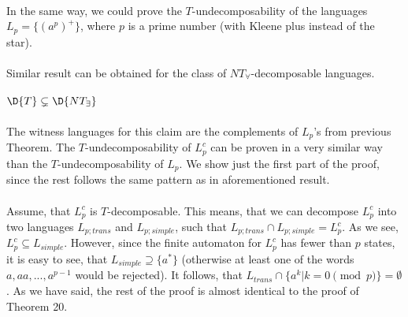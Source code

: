 \paragraph{}
\poznamka In the same way, we could prove the $T$-undecomposability of the languages $L_{p} = \{ (a^p)^+\}$,  where $p$ is a prime number (with Kleene plus instead of the star).

\paragraph{}
Similar result can be obtained for the class of $NT_{\forall}$-decomposable languages.

\paragraph{}
\cveta $\D{T} \subsetneq \D{NT_{\exists}}$

\paragraph{}
\dokaz The witness languages for this claim are the complements of $L_p$'s from previous Theorem. The $T$-undecomposability of $L_p^c$ can be proven in a very similar way than the $T$-undecomposability of $L_p$. We show just the first part of the proof, since the rest follows the same pattern as in aforementioned result.

\paragraph{}
Assume, that $L_{p}^c$ is $T$-decomposable. This means, that we can decompose $L_{p}^c$ into two languages $L_{p;trans}$ and $L_{p;simple}$, such that $L_{p;trans} \cap L_{p;simple} = L_{p}^c$. As we see, $L_{p}^c \subseteq L_{simple}$. However, since the finite automaton for $L_{p}^c$ has fewer than $p$ states, it is easy to see, that $L_{simple} \supseteq \{a^*\}$ (otherwise at least one of the words $a, aa, ..., a^{p-1}$ would be rejected). It  follows, that $L_{trans} \cap \{ a^k | k = 0 \pmod{p} \} = \emptyset$. As we  have said, the rest of the proof is almost identical to the proof of Theorem 20.

